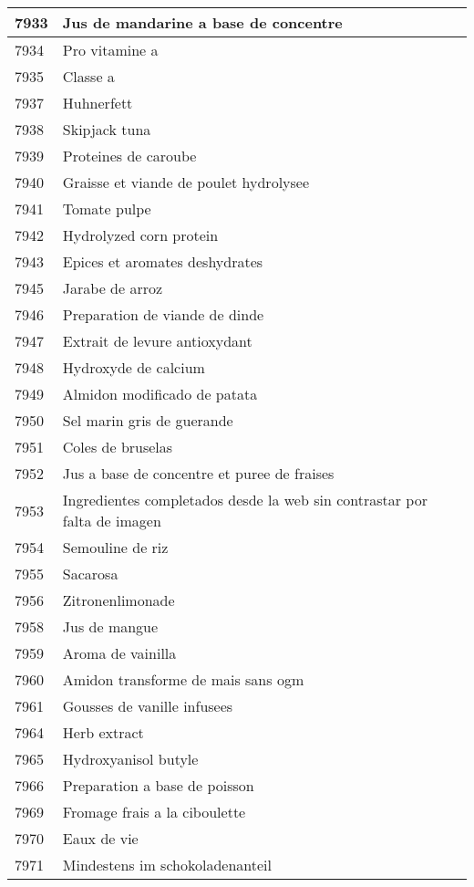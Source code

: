 \begin{longtable}{|l|l|}
7933 & Jus de mandarine a base de concentre \\ \hline 
7934 & Pro vitamine a \\ \hline 
7935 & Classe a \\ \hline 
7937 & Huhnerfett \\ \hline 
7938 & Skipjack tuna \\ \hline 
7939 & Proteines de caroube \\ \hline 
7940 & Graisse et viande de poulet hydrolysee \\ \hline 
7941 & Tomate pulpe \\ \hline 
7942 & Hydrolyzed corn protein \\ \hline 
7943 & Epices et aromates deshydrates \\ \hline 
7945 & Jarabe de arroz \\ \hline 
7946 & Preparation de viande de dinde \\ \hline 
7947 & Extrait de levure antioxydant \\ \hline 
7948 & Hydroxyde de calcium \\ \hline 
7949 & Almidon modificado de patata \\ \hline 
7950 & Sel marin gris de guerande \\ \hline 
7951 & Coles de bruselas \\ \hline 
7952 & Jus a base de concentre et puree de fraises \\ \hline 
7953 & Ingredientes completados desde la web sin contrastar por falta de imagen \\ \hline 
7954 & Semouline de riz \\ \hline 
7955 & Sacarosa \\ \hline 
7956 & Zitronenlimonade \\ \hline 
7958 & Jus de mangue \\ \hline 
7959 & Aroma de vainilla \\ \hline 
7960 & Amidon transforme de mais sans ogm \\ \hline 
7961 & Gousses de vanille infusees \\ \hline 
7964 & Herb extract \\ \hline 
7965 & Hydroxyanisol butyle \\ \hline 
7966 & Preparation a base de poisson \\ \hline 
7969 & Fromage frais a la ciboulette \\ \hline 
7970 & Eaux de vie \\ \hline 
7971 & Mindestens im schokoladenanteil \\ \hline 

\end{longtable}
